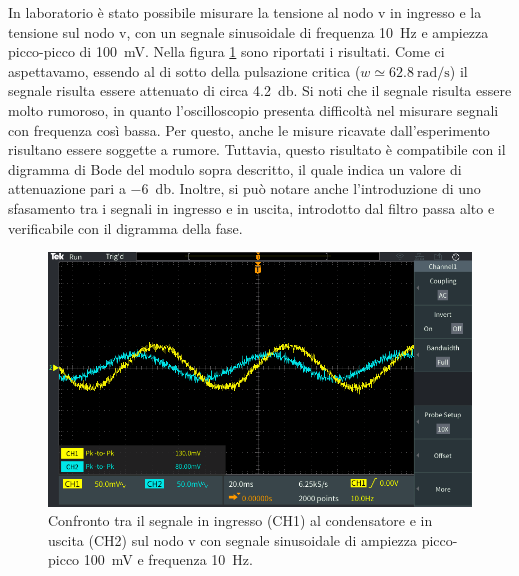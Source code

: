 In laboratorio è stato possibile misurare la tensione al nodo v in ingresso e la tensione sul nodo v, con un segnale sinusoidale di frequenza \SI{10}{\hertz} e ampiezza picco-picco di \SI{100}{\milli\volt}. Nella figura \ref{fig:hpf_10hz} sono riportati i risultati. Come ci aspettavamo, essendo al di sotto della pulsazione critica ($w\simeq\SI{62.8}{\radian/\second}$) il segnale risulta essere attenuato di circa \SI{4.2}{\decibel}. Si noti che il segnale risulta essere molto rumoroso, in quanto l'oscilloscopio presenta difficoltà nel misurare segnali con frequenza così bassa. Per questo, anche le misure ricavate dall'esperimento risultano essere soggette a rumore. Tuttavia, questo risultato è compatibile con il digramma di Bode del modulo sopra descritto, il quale indica un valore di attenuazione pari a \SI{-6}{\decibel}. Inoltre, si può notare anche l'introduzione di uno sfasamento tra i segnali in ingresso e in uscita, introdotto dal filtro passa alto e verificabile con il digramma della fase.
\begin{figure}[h!]
	\centering
	\includegraphics[width=0.6\linewidth]{./ImageFiles/Laboratorio 4/TEK00003}
	\caption{Confronto tra il segnale in ingresso (CH1) al condensatore e in uscita (CH2) sul nodo v con segnale sinusoidale di ampiezza picco-picco \SI{100}{\milli\volt} e frequenza \SI{10}{\hertz}.}
	\label{fig:hpf_10hz}
\end{figure}

